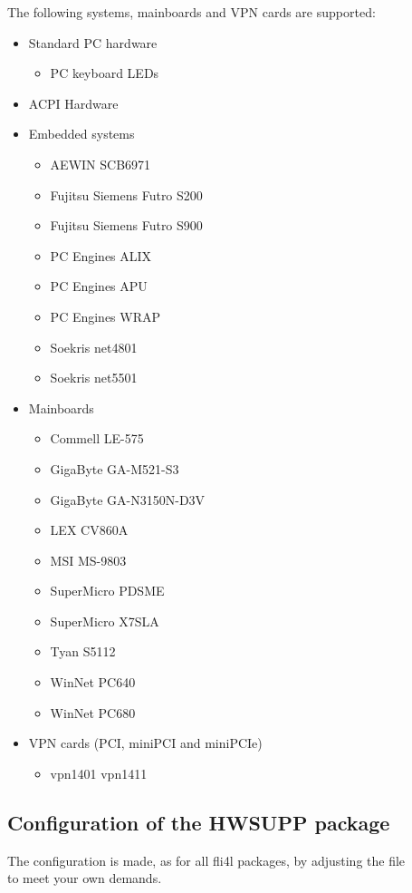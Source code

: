The following systems, mainboards and VPN cards are supported:
\begin{itemize}
  \item Standard PC hardware
  \begin{itemize}
    \item PC keyboard LEDs
  \end{itemize}
  \item ACPI Hardware
  \item Embedded systems
  \begin{itemize}
    \item AEWIN SCB6971
    \item Fujitsu Siemens Futro S200
    \item Fujitsu Siemens Futro S900
    \item PC Engines ALIX
    \item PC Engines APU
    \item PC Engines WRAP
    \item Soekris net4801
    \item Soekris net5501
  \end{itemize}
  \item Mainboards
  \begin{itemize}
    \item Commell LE-575
    \item GigaByte GA-M521-S3
    \item GigaByte GA-N3150N-D3V
    \item LEX CV860A
    \item MSI MS-9803
    \item SuperMicro PDSME
    \item SuperMicro X7SLA
    \item Tyan S5112
    \item WinNet PC640
    \item WinNet PC680
  \end{itemize}
    \item VPN cards (PCI, miniPCI and miniPCIe)
  \begin{itemize}
    \item vpn1401 vpn1411
  \end{itemize}
\end{itemize}


\subsection {Configuration of the HWSUPP package}

  The configuration is made, as for all fli4l packages, by adjusting the file\\
   to meet your own demands.

